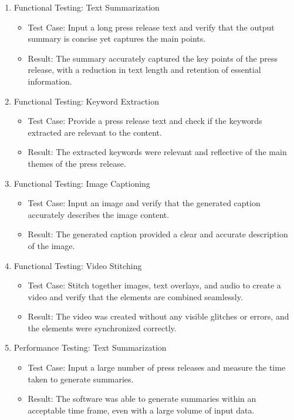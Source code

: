 \documentclass[12pt]{article}
\begin{document}
\begin{enumerate}
    \item Functional Testing: Text Summarization
    \begin{itemize}
        \item Test Case: Input a long press release text and verify that the output summary is concise yet captures the main points.
        \item Result: The summary accurately captured the key points of the press release, with a reduction in text length and retention of essential information.
    \end{itemize}

    \item Functional Testing: Keyword Extraction
    \begin{itemize}
        \item Test Case: Provide a press release text and check if the keywords extracted are relevant to the content.
        \item Result: The extracted keywords were relevant and reflective of the main themes of the press release.
    \end{itemize}

    \item Functional Testing: Image Captioning
    \begin{itemize}
        \item Test Case: Input an image and verify that the generated caption accurately describes the image content.
        \item Result: The generated caption provided a clear and accurate description of the image.
    \end{itemize}

    \item Functional Testing: Video Stitching
    \begin{itemize}
        \item Test Case: Stitch together images, text overlays, and audio to create a video and verify that the elements are combined seamlessly.
        \item Result: The video was created without any visible glitches or errors, and the elements were synchronized correctly.
    \end{itemize}

    \item Performance Testing: Text Summarization
    \begin{itemize}
        \item Test Case: Input a large number of press releases and measure the time taken to generate summaries.
        \item Result: The software was able to generate summaries within an acceptable time frame, even with a large volume of input data.
    \end{itemize}
 

\end{enumerate}
\end{document}

